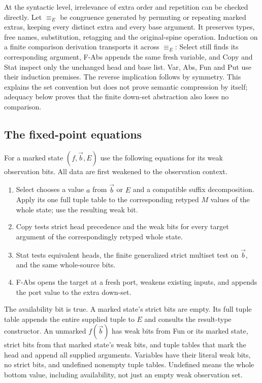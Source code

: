 \documentclass[11pt,a4paper]{article}
\begin{document}
At the syntactic level, irrelevance of extra order and repetition can be
checked directly. Let $\equiv_E$ be congruence generated by permuting or
repeating marked extras, keeping every distinct extra and every base
argument. It preserves types, free names, substitution, retagging and the
original-spine operation. Induction on a finite comparison derivation
transports it across $\equiv_E$: Select still finds its corresponding
argument, F-Abs appends the same fresh variable, and Copy and Stat inspect
only the unchanged head and base list. Var, Abs, Fun and Put use their
induction premises. The reverse implication follows by symmetry.
This explains the set convention but does not prove semantic compression
by itself; adequacy below proves that the finite down-set abstraction also
loses no comparison.

\subsection{The fixed-point equations}
For a marked state $(f,\vec b,E)$ use the following equations for its weak
observation bits.  All data are first weakened to the observation context.
\begin{enumerate}
\item Select chooses a value $a$ from $\vec b$ or $E$ and a compatible
suffix decomposition.  Apply its one full tuple table to the corresponding
retyped $M$ values of the whole state; use the resulting weak bit.
\item Copy tests strict head precedence and the weak bits for every
target argument of the correspondingly retyped whole state.
\item Stat tests equivalent heads, the finite generalized strict
multiset test on $\vec b$, and the same whole-source bits.
\item F-Abs opens the target at a fresh port, weakens existing inputs,
and appends the port value to the extra down-set.
\end{enumerate}
The availability bit is true.  A marked state's strict bits are empty.
Its full tuple table appends the entire supplied tuple to $E$ and consults
the result-type constructor.  An unmarked $f(\vec b)$ has weak bits from
Fun or its marked state, strict bits from that marked state's weak bits,
and tuple tables that mark the head and append all supplied arguments.
Variables have their literal weak bits, no strict bits, and undefined
nonempty tuple tables.  Undefined means the whole bottom value, including
availability, not just an empty weak observation set.
\end{document}
